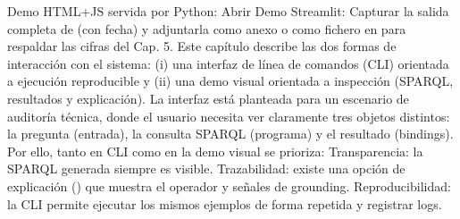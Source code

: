 {}\markdownRendererUlBegin
\markdownRendererUlItem Demo HTML+JS servida por Python:\markdownRendererInterblockSeparator
{}\markdownRendererUlBeginTight
\markdownRendererUlItem {}\markdownRendererUlItemEnd 
\markdownRendererUlItem Abrir \markdownRendererUlItemEnd 
\markdownRendererUlEndTight \markdownRendererUlItemEnd 
\markdownRendererUlItem Demo Streamlit:\markdownRendererInterblockSeparator
{}\markdownRendererUlBeginTight
\markdownRendererUlItem {}\markdownRendererUlItemEnd 
\markdownRendererUlEndTight \markdownRendererUlItemEnd 
\markdownRendererUlEnd \markdownRendererInterblockSeparator
{} Capturar la salida completa de  (con fecha) y adjuntarla como anexo o como fichero en  para respaldar las cifras del Cap. 5.\markdownRendererInterblockSeparator
{}\markdownRendererHorizontalRule{}\markdownRendererInterblockSeparator
{}\markdownRendererInterblockSeparator
{}Este capítulo describe las dos formas de interacción con el sistema: (i) una interfaz de línea de comandos (CLI) orientada a ejecución reproducible y (ii) una demo visual orientada a inspección (SPARQL, resultados y explicación).\markdownRendererInterblockSeparator
{}\markdownRendererInterblockSeparator
{}La interfaz está planteada para un escenario de auditoría técnica, donde el usuario necesita ver claramente tres objetos distintos: la pregunta (entrada), la consulta SPARQL (programa) y el resultado (bindings). Por ello, tanto en CLI como en la demo visual se prioriza:\markdownRendererInterblockSeparator
{}\markdownRendererUlBeginTight
\markdownRendererUlItem Transparencia: la SPARQL generada siempre es visible.\markdownRendererUlItemEnd 
\markdownRendererUlItem Trazabilidad: existe una opción de explicación () que muestra el operador y señales de grounding.\markdownRendererUlItemEnd 
\markdownRendererUlItem Reproducibilidad: la CLI permite ejecutar los mismos ejemplos de forma repetida y registrar logs.\markdownRendererUlItemEnd 
\markdownRendererUlEndTight \markdownRendererInterblockSeparator
{}\markdownRendererInterblockSeparator
